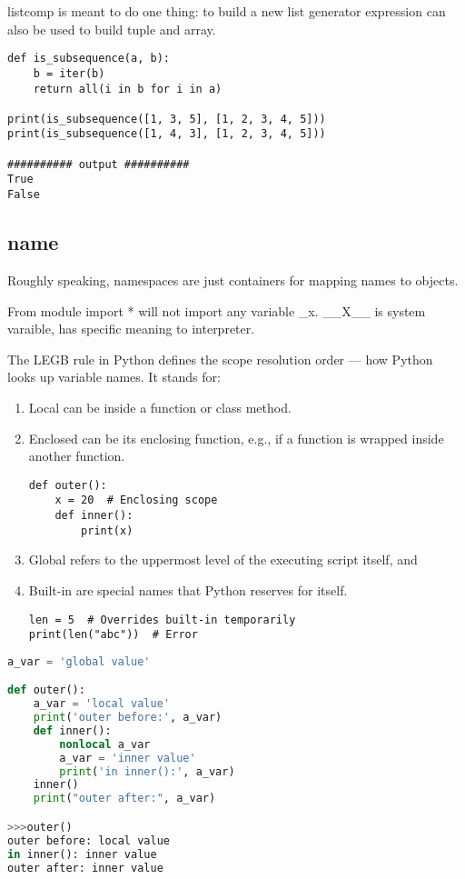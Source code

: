 \documentclass[a4paper,12pt,twoside]{book}
\begin{document}
		
listcomp is meant to do one thing: to build a new list
generator expression can also be used to build tuple and array.

\begin{lstlisting}
def is_subsequence(a, b):
	b = iter(b)
	return all(i in b for i in a)

print(is_subsequence([1, 3, 5], [1, 2, 3, 4, 5]))
print(is_subsequence([1, 4, 3], [1, 2, 3, 4, 5]))

########## output ##########
True
False
\end{lstlisting}

\subsection{name}

Roughly speaking, namespaces are just containers for mapping names to objects. 
	
From module import * will not import  any variable \_x. \_\_X\_\_ is system varaible, has specific meaning to interpreter. 

The LEGB rule in Python defines the scope resolution order — how Python looks up variable names. It stands for:
	\begin{enumerate}
		\item Local can be inside a function or class method.
		
		\item Enclosed can be its enclosing function, e.g., if a function is wrapped inside another function.
		
\begin{lstlisting}
def outer():
	x = 20  # Enclosing scope
	def inner():
		print(x)
\end{lstlisting}
		\item Global refers to the uppermost level of the executing script itself, and
		
		\item Built-in are special names that Python reserves for itself.
\begin{lstlisting}
len = 5  # Overrides built-in temporarily
print(len("abc"))  # Error
\end{lstlisting}
	\end{enumerate}

\begin{lstlisting}[frame=single, language=Python]
a_var = 'global value'

def outer():
	a_var = 'local value'
	print('outer before:', a_var)
	def inner():
		nonlocal a_var
		a_var = 'inner value'
		print('in inner():', a_var)
	inner()
	print("outer after:", a_var)

>>>outer()
outer before: local value
in inner(): inner value
outer after: inner value
	\end{lstlisting}  
	
\end{document}
